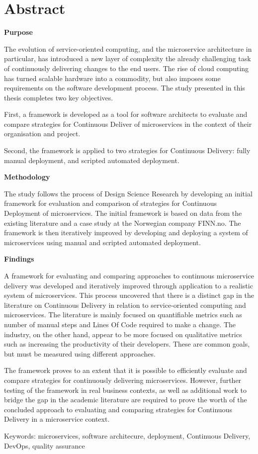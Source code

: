 \chapter*{Abstract}

\textbf{Purpose}

The evolution of service-oriented computing, and the microservice architecture in particular, has introduced a new layer of complexity the already challenging task of continuously delivering changes to the end users. The rise of cloud computing has turned scalable hardware into a commodity, but also imposes some requirements on the software development process. The study presented in this thesis completes two key objectives.

First, a framework is developed as a tool for software architects to evaluate and compare strategies for Continuous Deliver of microservices in the context of their organisation and project.

Second, the framework is applied to two strategies for Continuous Delivery: fully manual deployment, and scripted automated deployment.

\textbf{Methodology}

The study follows the process of Design Science Research by developing an initial framework for evaluation and comparison of strategies for Continuous Deployment of microservices. The initial framework is based on data from the existing literature and a case study at the Norwegian company FINN.no. The framework is then iteratively improved by developing and deploying a system of microservices using manual and scripted automated deployment. 

\textbf{Findings}

A framework for evaluating and comparing approaches to continuous microservice delivery was developed and iteratively improved through application to a realistic system of microservices. This process uncovered that there is a distinct gap in the literature on Continuous Delivery in relation to service-oriented computing and microservices. The literature is mainly focused on quantifiable metrics such as number of manual steps and Lines Of Code required to make a change. The industry, on the other hand, appear to be more focused on qualitative metrics such as increasing the productivity of their developers. These are common goals, but must be measured using different approaches.

The framework proves to an extent that it is possible to efficiently evaluate and compare strategies for continuously delivering microservices. However, further testing of the framework in real business contexts, as well as additional work to bridge the gap in the academic literature are required to prove the worth of the concluded approach to evaluating and comparing strategies for Continuous Delivery in a microservice context.

Keywords: microservices, software architecure, deployment, Continuous Delivery, DevOps, quality assurance
